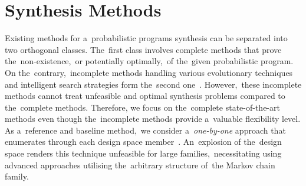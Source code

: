 \section{Synthesis Methods}
Existing methods for a~probabilistic programs synthesis can be separated into two orthogonal classes.
The~first class involves complete methods that prove the~non-existence,~or potentially optimally,~of the~given probabilistic program.
On the~contrary,~incomplete methods handling various evolutionary techniques and intelligent search strategies form the~second one~\cite{spl2}.
However,~these incomplete methods cannot treat unfeasible and optimal synthesis problems compared to the~complete methods.
Therefore, we focus on the~complete state-of-the-art methods even though the~incomplete methods provide a~valuable flexibility level.
As a~reference and baseline method,~we consider a~\textit{one-by-one} approach that enumerates through each design space member~\cite{onebyone}.
An~explosion of the~design space renders this technique unfeasible for large families,~necessitating using advanced approaches utilising the~arbitrary structure of~the Markov chain family.

